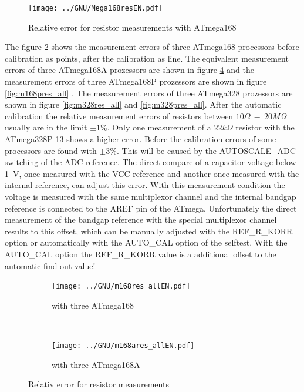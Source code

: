 \begin{figure}[H]
\centering
\texttt{[image: ../GNU/Mega168resEN.pdf]}
\caption{Relative error for resistor measurements with ATmega168 }
\label{fig:mega168res}
\end{figure}

The figure \ref{fig:m168res_all} shows the measurement errors of three ATmega168 processors before calibration as points, after the
calibration as line. The equivalent measurement errors of three ATmega168A prozessors are shown in figure \ref{fig:m168ares_all} and
the measurement errors of three ATmega168P prozessors are shown in figure \ref{fig:m168pres_all} .
The measurement errors of three ATmega328 prozessors are shown in figure \ref{fig:m328res_all} and \ref{fig:m328pres_all}.
After the automatic calibration the relative measurement errors of resistors between \(10\Omega~-~20 M\Omega\) 
usually are in the limit \(\pm1\%\). Only one measurement of a \(22k\Omega\) resistor with the ATmega328P-13 shows 
a higher error.
Before the calibration errors of some processors are found with \(\pm3\%\).
This will be caused by the AUTOSCALE\_ADC switching of the ADC reference.
The direct compare of a capacitor voltage below 1~V, once measured with the VCC reference and another once measured with 
the internal reference, can adjust this error.
With this measurement condition the voltage is measured with the same multiplexor channel and the internal bandgap reference
is connected to the AREF pin of the ATmega.
Unfortunately the direct measurement of the bandgap reference with the special multiplexor channel results to this offset,
which can be manually adjusted with the REF\_R\_KORR option or automatically with the AUTO\_CAL option of the selftest.
With the AUTO\_CAL option the REF\_R\_KORR value is a additional offset to the automatic find out value!

\begin{figure}[H]
  \begin{subfigure}[b]{.5\textwidth}
    \centering
    \texttt{[image: ../GNU/m168res\_allEN.pdf]}
    \caption{with three ATmega168}
    \label{fig:m168res_all}
  \end{subfigure}
  ~
  \begin{subfigure}[b]{.5\textwidth}
    \centering
    \texttt{[image: ../GNU/m168ares\_allEN.pdf]}
    \caption{with three ATmega168A}
    \label{fig:m168ares_all}
  \end{subfigure}
\caption{Relativ error for resistor measurements}
\end{figure}


